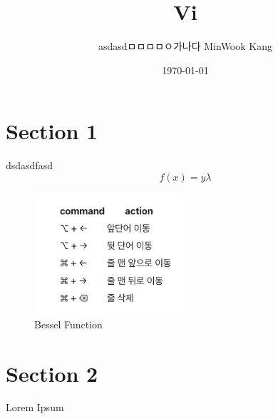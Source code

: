 \documentclass[11pt]{article}
\title{ Vi }
\author{asdasdㅁㅁㅁㅁㅇ가나다 MinWook Kang }
\date{\today}
\begin{document}
\maketitle
\pagebreak



\section{Section 1}
\noindent
dsdasdfasd
\begin{equation}
    f(x) = y \lambda
\end{equation}

\begin{figure}[!ht]
  \centering
  \includegraphics[width=0.5\textwidth]{mac.png}
  \caption{Bessel Function}
\end{figure}

\pagebreak
\section{Section 2}
Lorem Ipsum \\

\end{document}
